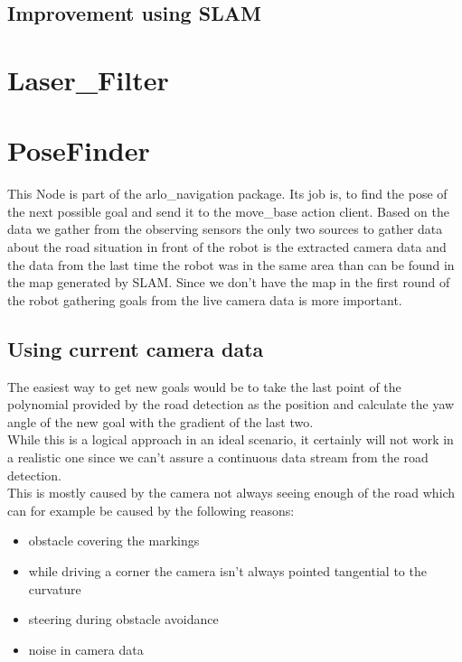 \subsection{Improvement using SLAM}

\section{Laser\_Filter}

\section{PoseFinder}
This Node is part of the arlo\_navigation package. Its job is, to find the pose of the next possible goal and send it to the move\_base action client.
Based on the data we gather from the observing sensors the only two sources to gather data about the road situation in front of the robot is the extracted camera data and the data from the last time the robot was in the same area than can be found in the map generated by SLAM.
Since we don't have the map in the first round of the robot gathering goals from the live camera data is more important. 
\subsection{Using current camera data}
The easiest way to get new goals would be to take the last point of the polynomial provided by the road detection as the position and calculate the yaw angle of the new goal with the gradient of the last two.\\

While this is a logical approach in an ideal scenario, it certainly will not work in a realistic one since we can't assure a continuous data stream from the road detection.\\

This is mostly caused by the camera not always seeing enough of the road which can for example be caused by the following reasons:

\begin{itemize}
	\item obstacle covering the markings
	\item while driving a corner the camera isn't always pointed tangential to the curvature
	\item steering during obstacle avoidance
	\item noise in camera data
\end{itemize}


